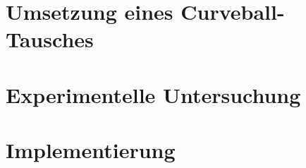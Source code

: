 \documentclass[a4paper]{scrreprt}
\theoremstyle{plain} %
\theoremstyle{definition} %
\newcommand{\ct}{Curveball-Tausch}
\newcommand{\red}[1]{\textcolor{red}{\textbf{#1}}}
\begin{document}










\chapter{Umsetzung eines \ct{es} }




\chapter{Experimentelle Untersuchung}










\chapter{Implementierung}
\end{document}
